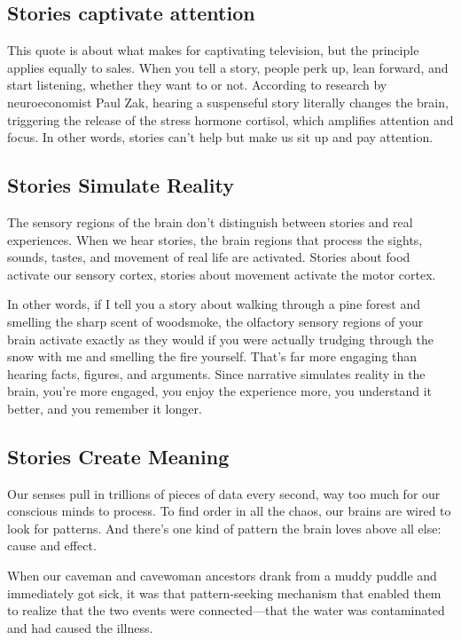 \documentclass[12pt]{article}
\begin{document}
\subsection{Stories captivate attention}
\label{sec:org25884b4}
This quote is about what makes for captivating television, but the principle applies equally to sales. When you tell a story, people perk up, lean forward, and start listening, whether they want to or not. According to research by neuroeconomist Paul Zak, hearing a suspenseful story literally changes the brain, triggering the release of the stress hormone cortisol, which amplifies attention and focus. In other words, stories can't help but make us sit up and pay attention.

\subsection{Stories Simulate Reality}
\label{sec:org4b3acc4}
The sensory regions of the brain don't distinguish between stories and real experiences. When we hear stories, the brain regions that process the sights, sounds, tastes, and movement of real life are activated. Stories about food activate our sensory cortex, stories about movement activate the motor cortex.

In other words, if I tell you a story about walking through a pine forest and smelling the sharp scent of woodsmoke, the olfactory sensory regions of your brain activate exactly as they would if you were actually trudging through the snow with me and smelling the fire yourself. That's far more engaging than hearing facts, figures, and arguments. Since narrative simulates reality in the brain, you're more engaged, you enjoy the experience more, you understand it better, and you remember it longer.

\subsection{Stories Create Meaning}
\label{sec:org1af359e}

Our senses pull in trillions of pieces of data every second, way too much for our conscious minds to process. To find order in all the chaos, our brains are wired to look for patterns. And there's one kind of pattern the brain loves above all else: cause and effect.

When our caveman and cavewoman ancestors drank from a muddy puddle and immediately got sick, it was that pattern-seeking mechanism that enabled them to realize that the two events were connected---that the water was contaminated and had caused the illness.
\end{document}
